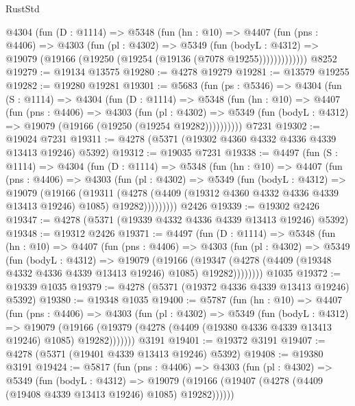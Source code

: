 \begin{lexlean}{RustStd}
\begin{coremodule}
{\begin{coremodule}
{{{{{{{{{{{{{{{{{{{{{{{{{{{{{{{{{{{        @4304
          (fun (D : @1114) =>
          @5348
            (fun (hn : @10) =>
            @4407
              (fun (pns : @4406) =>
              @4303
                (fun (pl : @4302) =>
                @5349
                  (fun (bodyL : @4312) =>
                  @19079 (@19166 (@19250 (@19254 (@19136 (@7078 @19255)))))))))))))
    @8252
@19279 := @19134 @13575
@19280 := @4278 @19279
@19281 := @13579 @19255
@19282 := @19280 @19281
@19301 := @5683
    (fun (ps : @5346) =>
    @4304
      (fun (S : @1114) =>
      @4304
        (fun (D : @1114) =>
        @5348
          (fun (hn : @10) =>
          @4407
            (fun (pns : @4406) =>
            @4303
              (fun (pl : @4302) =>
              @5349 (fun (bodyL : @4312) => @19079 (@19166 (@19250 (@19254 @19282))))))))))
    @7231
@19302 := @19024 @7231
@19311 := @4278 (@5371 (@19302 @4360 @4332 @4336 @4339 @13413 @19246) @5392)
@19312 := @19035 @7231
@19338 := @4497
    (fun (S : @1114) =>
    @4304
      (fun (D : @1114) =>
      @5348
        (fun (hn : @10) =>
        @4407
          (fun (pns : @4406) =>
          @4303
            (fun (pl : @4302) =>
            @5349
              (fun (bodyL : @4312) =>
              @19079
                (@19166
                  (@19311
                    (@4278
                      (@4409 (@19312 @4360 @4332 @4336 @4339 @13413 @19246) @1085)
                      @19282)))))))))
    @2426
@19339 := @19302 @2426
@19347 := @4278 (@5371 (@19339 @4332 @4336 @4339 @13413 @19246) @5392)
@19348 := @19312 @2426
@19371 := @4497
    (fun (D : @1114) =>
    @5348
      (fun (hn : @10) =>
      @4407
        (fun (pns : @4406) =>
        @4303
          (fun (pl : @4302) =>
          @5349
            (fun (bodyL : @4312) =>
            @19079
              (@19166
                (@19347 (@4278 (@4409 (@19348 @4332 @4336 @4339 @13413 @19246) @1085) @19282))))))))
    @1035
@19372 := @19339 @1035
@19379 := @4278 (@5371 (@19372 @4336 @4339 @13413 @19246) @5392)
@19380 := @19348 @1035
@19400 := @5787
    (fun (hn : @10) =>
    @4407
      (fun (pns : @4406) =>
      @4303
        (fun (pl : @4302) =>
        @5349
          (fun (bodyL : @4312) =>
          @19079
            (@19166 (@19379 (@4278 (@4409 (@19380 @4336 @4339 @13413 @19246) @1085) @19282)))))))
    @3191
@19401 := @19372 @3191
@19407 := @4278 (@5371 (@19401 @4339 @13413 @19246) @5392)
@19408 := @19380 @3191
@19424 := @5817
    (fun (pns : @4406) =>
    @4303
      (fun (pl : @4302) =>
      @5349
        (fun (bodyL : @4312) =>
        @19079 (@19166 (@19407 (@4278 (@4409 (@19408 @4339 @13413 @19246) @1085) @19282))))))
}}}}}}}}}}}}}}}}}}}}}}}}}}}}}}}}}}}
\end{coremodule}}
\end{coremodule}
\end{lexlean}

